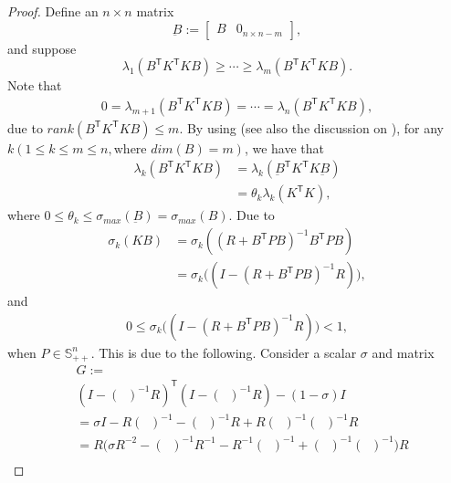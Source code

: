 \documentclass{article}
\newcommand{\transpose}{\mathsf{T}}
\DeclareMathOperator{\tempRBP}{R + B^{\transpose}PB}
\begin{document}
\begin{proof}
    Define an $n\times n$ matrix
    \begin{equation}
        \underbar{B} := 
        \begin{bmatrix}
            B & 0_{n\times n-m}
        \end{bmatrix},
    \end{equation}
    and suppose
    \begin{equation}
        \lambda_{1}(B^{\transpose}K^{\transpose}KB) \geq \cdots \geq \lambda_{m}(B^{\transpose}K^{\transpose}KB).
    \end{equation}
    Note that
    \begin{align*}
       0 =  \lambda_{m+1}(B^{\transpose}K^{\transpose}KB) = \cdots = \lambda_{n}(B^{\transpose}K^{\transpose}KB),
    \end{align*}
    due to $\textit{rank}(B^{\transpose}K^{\transpose}KB) \leq m$.
    By using \cite[Theorem 4.5.9]{horn_matrix_2013} (see also the discussion on \cite[p.~284]{horn_matrix_2013}), for any $k(1\leq k\leq m\leq n,\text{where $\textit{dim}(B)=m$})$,
    we have that
    \begin{align*}
        \lambda_{k}(B^{\transpose}K^{\transpose}KB) &= \lambda_{k}(\underbar{B}^{\transpose}K^{\transpose}K\underbar{B})\\
        &= \theta_{k}\lambda_{k}(K^{\transpose}K),
    \end{align*}
    where $0\leq \theta_{k} \leq \sigma_{max}(\underbar{B})=\sigma_{max}(B)$.
    Due to
    \begin{align*}
        \sigma_{k}(KB) &= \sigma_{k}((R+B^{\transpose}PB)^{-1}B^{\transpose}PB)\\
        &= \sigma_{k}\bigg((I - (R+B^{\transpose}PB)^{-1}R) \bigg),
    \end{align*}
    and
    \begin{align*}
       0 \leq \sigma_{k}\bigg((I - (R+B^{\transpose}PB)^{-1}R) \bigg) < 1,
    \end{align*}
    when $P \in \mathbb{S}_{++}^{n}$. This is due to the following. Consider a scalar $\sigma$ and matrix
    \begin{align*}
        &G :=\\
        &(I-(\tempRBP)^{-1}R)^{\transpose}(I-(\tempRBP)^{-1}R) - (1-\sigma) I \\
        &= \sigma I - R(\tempRBP)^{-1} - (\tempRBP)^{-1}R + R(\tempRBP)^{-1}(\tempRBP)^{-1}R\\
        &= R\bigg(\sigma R^{-2} - (\tempRBP)^{-1}R^{-1} - R^{-1}(\tempRBP)^{-1} + (\tempRBP)^{-1}(\tempRBP)^{-1} \bigg)R\\

\end{align*}
\end{proof}
\end{document}
